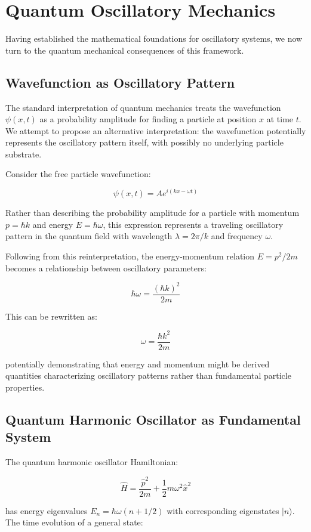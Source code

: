 \documentclass[11pt]{article}
\theoremstyle{remark}
\begin{document}
\section{Quantum Oscillatory Mechanics}

Having established the mathematical foundations for oscillatory systems, we now turn to the quantum mechanical consequences of this framework.

\subsection{Wavefunction as Oscillatory Pattern}

The standard interpretation of quantum mechanics treats the wavefunction $\psi(x,t)$ as a probability amplitude for finding a particle at position $x$ at time $t$. We attempt to propose an alternative interpretation: the wavefunction potentially represents the oscillatory pattern itself, with possibly no underlying particle substrate.

Consider the free particle wavefunction:

$$\psi(x,t) = A e^{i(kx - \omega t)}$$

Rather than describing the probability amplitude for a particle with momentum $p = \hbar k$ and energy $E = \hbar \omega$, this expression represents a traveling oscillatory pattern in the quantum field with wavelength $\lambda = 2\pi/k$ and frequency $\omega$.

Following from this reinterpretation, the energy-momentum relation $E = p^2/2m$ becomes a relationship between oscillatory parameters:

$$\hbar \omega = \frac{(\hbar k)^2}{2m}$$

This can be rewritten as:

$$\omega = \frac{\hbar k^2}{2m}$$

potentially demonstrating that energy and momentum might be derived quantities characterizing oscillatory patterns rather than fundamental particle properties.

\subsection{Quantum Harmonic Oscillator as Fundamental System}

The quantum harmonic oscillator Hamiltonian:

$$\hat{H} = \frac{\hat{p}^2}{2m} + \frac{1}{2}m\omega^2\hat{x}^2$$

has energy eigenvalues $E_n = \hbar\omega(n + 1/2)$ with corresponding eigenstates $|n\rangle$. The time evolution of a general state:
\end{document}
